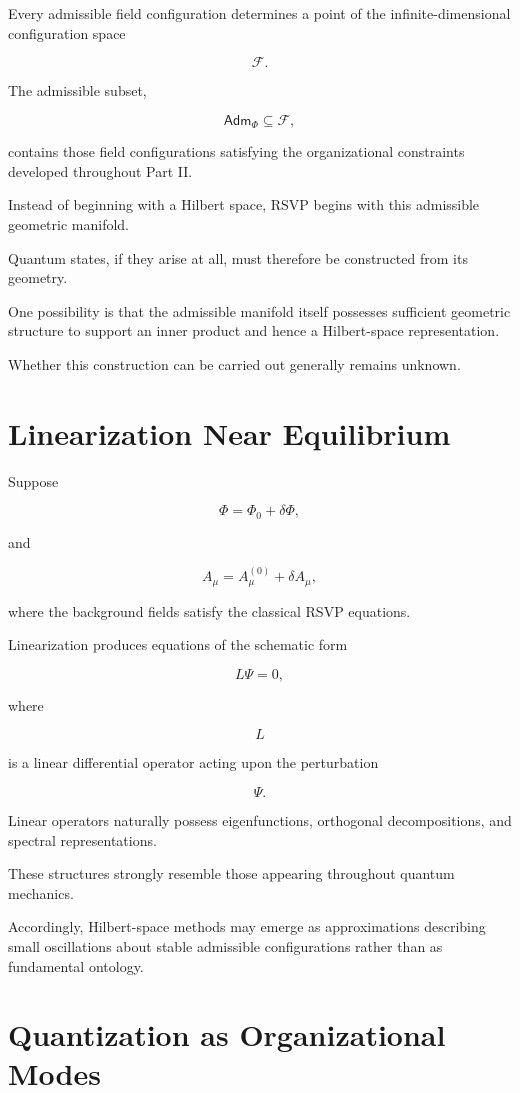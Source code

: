 \documentclass[11pt,oneside]{book}
\numberwithin{equation}{chapter}
\theoremstyle{definition}
\theoremstyle{plain}
\newcommand{\Adm}{\mathsf{Adm}}
\begin{document}
Every admissible field configuration determines a point of the
infinite-dimensional configuration space

\[
\mathcal F.
\]

The admissible subset,

\[
\Adm_\Phi
\subseteq
\mathcal F,
\]

contains those field configurations satisfying the organizational
constraints developed throughout Part II.

Instead of beginning with a Hilbert space, RSVP begins with this admissible
geometric manifold.

Quantum states, if they arise at all, must therefore be constructed from its
geometry.

One possibility is that the admissible manifold itself possesses sufficient
geometric structure to support an inner product and hence a Hilbert-space
representation.

Whether this construction can be carried out generally remains unknown.

\section{Linearization Near Equilibrium}

Suppose

\[
\Phi
=
\Phi_0
+
\delta\Phi,
\]

and

\[
A_\mu
=
A_\mu^{(0)}
+
\delta A_\mu,
\]

where the background fields satisfy the classical RSVP equations.

Linearization produces equations of the schematic form

\[
L
\Psi
=
0,
\]

where

\[
L
\]

is a linear differential operator acting upon the perturbation

\[
\Psi.
\]

Linear operators naturally possess eigenfunctions, orthogonal
decompositions, and spectral representations.

These structures strongly resemble those appearing throughout quantum
mechanics.

Accordingly, Hilbert-space methods may emerge as approximations describing
small oscillations about stable admissible configurations rather than as
fundamental ontology.

\section{Quantization as Organizational Modes}
\end{document}
